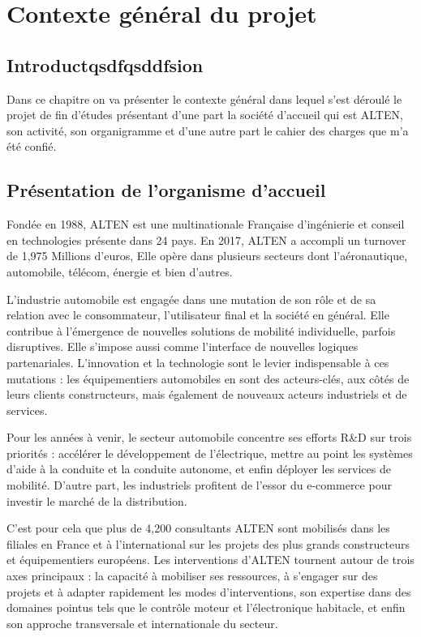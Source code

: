 \chapter{Contexte général du projet}
\section*{Introductqsdfqsddfsion}
Dans ce chapitre on va présenter le contexte général dans lequel s’est déroulé le projet de fin d’études présentant d’une part la société d’accueil qui est ALTEN, son activité, son organigramme et d’une autre part le cahier des charges que m’a été confié.

\section{Présentation de l'organisme d'accueil}
Fondée en 1988, ALTEN est une multinationale Française d’ingénierie et conseil en technologies présente dans 24 pays. En 2017, ALTEN a accompli un turnover de 1,975 Millions d’euros, Elle opère dans plusieurs secteurs dont l’aéronautique, automobile, télécom, énergie et bien d’autres. 

L’industrie automobile est engagée dans une mutation de son rôle et de sa relation avec le consommateur, l’utilisateur final et la société en général. Elle contribue à l’émergence de nouvelles solutions de mobilité individuelle, parfois disruptives. Elle s’impose aussi comme l’interface de nouvelles logiques partenariales. L’innovation et la technologie sont le levier indispensable à ces mutations : les équipementiers automobiles en sont des acteurs-clés, aux côtés de leurs clients constructeurs, mais également de nouveaux acteurs industriels et de services.

Pour les années à venir, le secteur automobile concentre ses efforts R\&D sur trois priorités : accélérer le développement de l’électrique, mettre au point les systèmes d’aide à la conduite et la conduite autonome, et enfin déployer les services de mobilité. D’autre part, les industriels profitent de l’essor du e-commerce pour investir le marché de la distribution.

C’est pour cela que plus de 4,200 consultants ALTEN sont mobilisés dans les filiales en France et à l’international sur les projets des plus grands constructeurs et équipementiers européens. Les interventions d’ALTEN tournent autour de trois axes principaux : la capacité à mobiliser ses ressources, à s’engager sur des projets et à adapter rapidement les modes d’interventions, son expertise dans des domaines pointus tels que le contrôle moteur et l’électronique habitacle, et enfin son approche transversale et internationale du secteur.

